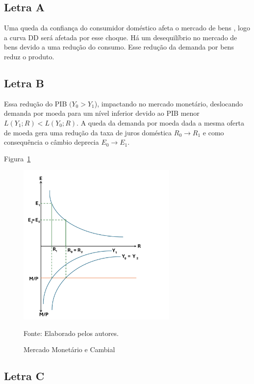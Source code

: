 \documentclass[a4paper,12pt]{article}[abntex2]
\begin{document}
\subsection{\textbf{Letra A}}
Uma queda da confiança do consumidor doméstico afeta o mercado de bens , logo a curva DD será afetada por esse choque. Há um desequilíbrio no mercado de bens devido a uma redução do consumo. Esse redução da demanda por bens reduz o produto.

\subsection{\textbf{Letra B}}

 Essa redução do PIB \((Y_0>Y_1\)), impactando no mercado monetário, deslocando demanda por moeda para um nível inferior devido ao PIB menor \(L(Y_1;R)<L(Y_0;R)\). A queda da demanda por moeda dada a mesma oferta de moeda gera uma redução da taxa de juros doméstica \(R_0 \to R_1\) e como consequência o câmbio deprecia \(E_0 \to E_1\).

\newpage
Figura~\ref{fig:Moeda La}

\begin{figure}[H]
    \centering
    \caption{Mercado Monetário e Cambial} 
    \includegraphics[width=0.7\textwidth]{4º Período/Macroeconomia Internacional/APS 4 Macro Int/Merc. Mont L(a).png}
    \label{fig:Moeda La}
    
    \footnotesize{Fonte: Elaborado pelos autores.}
    \end{figure}
    
\subsection{\textbf{Letra C}}
\end{document}
